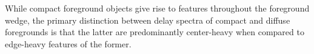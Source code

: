 \documentclass[preprint2,iop,numberedappendix]{emulateapj}
\begin{document}
While compact foreground objects give rise to features throughout the foreground wedge, the primary distinction between delay spectra of compact and diffuse foregrounds is that the latter are predominantly center-heavy when compared to edge-heavy features of the former. 


\end{document}
